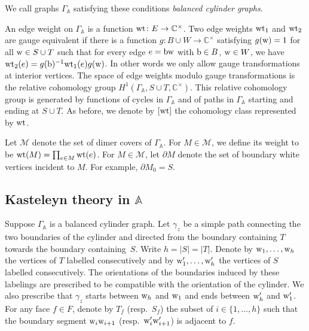 \documentclass[pdftex]{sigma}
\numberwithin{equation}{section}
\newcommand{\bcg}{{balanced cylinder graph}}
\newcommand{\C}{{\mathbb C}}
\newcommand{\A}{{\mathbb A}}
\newcommand{\ra}{\rightarrow}
\newcommand{\w}{{\rm w}}
\newcommand{\bw}{{\rm b}}
\newcommand{\wt}{{\rm wt}}
\begin{document}
	
	
	We call graphs $\Gamma_\A$ satisfying these conditions \emph{{\bcg }s}.
	
	
	An edge weight on $\Gamma_\A$ is a function $\wt\colon E \ra \C^\times$. Two edge weights ${\rm wt}_1$ and ${\rm wt}_2$ are gauge equivalent if there is a function $g\colon B \cup W \ra \C^\times$ satisfying $g(\w)=1$ for all $\w \in S \cup T$ such that for every edge $e=\bw \w$ with ${\rm b} \in B$, ${\rm w}\in W$, we have ${\rm wt}_2(e)=g({\rm b})^{-1} {\rm wt}_1(e) g({\rm w}) $. In other words we only allow gauge transformations at interior vertices. The space of edge weights modulo gauge transformations is the relative cohomology group $H^1(\Gamma_\A, S \cup T,\C^\times)$. {This relative cohomology group is generated by functions of cycles in $\Gamma_\A$ and of paths in $\Gamma_\A$ starting and ending at $S\cup T$.}
	As before, we denote by $[{\rm wt}]$ the cohomology class represented by ${\rm wt}$.
	
	Let $\mathcal M$ denote the set of dimer covers of $\Gamma_\A$. For $M \in \mathcal M$, we define its {weight} to be $\wt(M)=\prod_{e \in M} \wt(e)$. For $M \in \mathcal M$, let $\partial M$ denote the set of boundary white vertices incident to $M$. For example, $\partial M_0=S$.
	
\subsection[Kasteleyn theory in A]{Kasteleyn theory in $\boldsymbol{\A}$}
	\label{subsec:Kasteleyncylinder}
	
Suppose $\Gamma_\A$ is a \bcg. Let $\gamma_z$ be a simple path connecting the two boundaries of the cylinder and directed from the boundary containing $T$ towards the boundary containing~$S$. Write $h=|S|=|T|$. Denote by $\w_1,\dots,\w_h$ the vertices of $T$ labelled consecutively and by $\w'_1,\dots,\w'_h$ the vertices of $S$ labelled consecutively. The orientations of the boundaries induced by these labelings are prescribed to be compatible with the orientation of the cylinder. We also prescribe that $\gamma_z$ starts between $\w_h$ and $\w_1$ and ends between $\w'_h$ and $\w'_1$. For any face $f\in F$, denote by $T_f$ (resp.\ $S_f$) the subset of $i\in \{1,\dots,h\}$ such that the boundary segment $\w_i\w_{i+1}$ \big(resp.\ $\w'_i \w'_{i+1}$\big) is adjacent to $f$.
	
\end{document}
